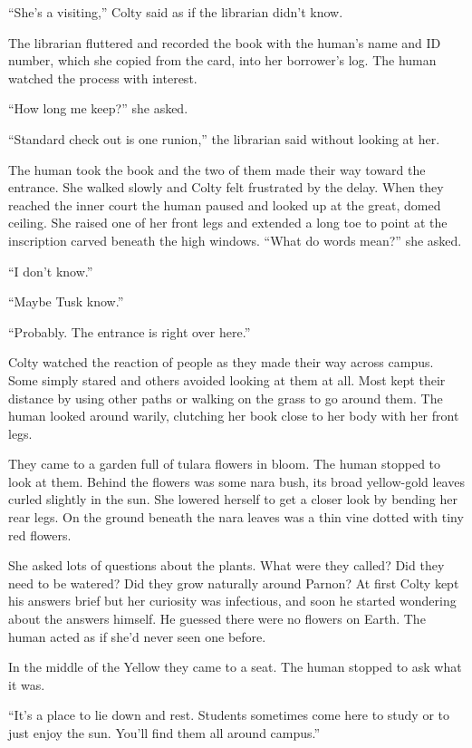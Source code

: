 ``She's a visiting,'' Colty said as if the librarian didn't know.

The librarian fluttered and recorded the book with the human's name and ID number, which she
copied from the card, into her borrower's log. The human watched the process with interest.

``How long me keep?'' she asked.

``Standard check out is one runion,'' the librarian said without looking at her.

The human took the book and the two of them made their way toward the entrance. She walked
slowly and Colty felt frustrated by the delay. When they reached the inner court the human
paused and looked up at the great, domed ceiling. She raised one of her front legs and extended
a long toe to point at the inscription carved beneath the high windows. ``What do words mean?''
she asked.

``I don't know.''

``Maybe Tusk know.''

``Probably. The entrance is right over here.''

Colty watched the reaction of people as they made their way across campus. Some simply stared
and others avoided looking at them at all. Most kept their distance by using other paths or
walking on the grass to go around them. The human looked around warily, clutching her book close
to her body with her front legs.

They came to a garden full of tulara flowers in bloom. The human stopped to look at them. Behind
the flowers was some nara bush, its broad yellow-gold leaves curled slightly in the sun. She
lowered herself to get a closer look by bending her rear legs. On the ground beneath the nara
leaves was a thin vine dotted with tiny red flowers.

She asked lots of questions about the plants. What were they called? Did they need to be
watered? Did they grow naturally around Parnon? At first Colty kept his answers brief but her
curiosity was infectious, and soon he started wondering about the answers himself. He guessed
there were no flowers on Earth. The human acted as if she'd never seen one before.

In the middle of the Yellow they came to a seat. The human stopped to ask what it was.

``It's a place to lie down and rest. Students sometimes come here to study or to just enjoy the
sun. You'll find them all around campus.''

